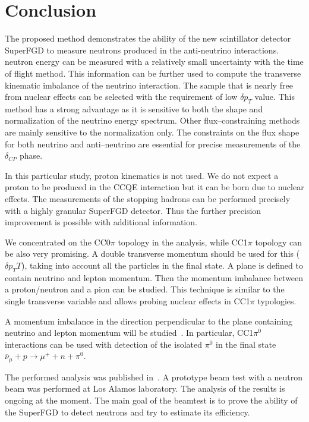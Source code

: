 \documentclass[main.tex]{subfiles}
\begin{document}
\section{Conclusion}
The proposed method demonstrates the ability of the new scintillator detector SuperFGD to measure neutrons produced in the anti-neutrino interactions. neutron energy can be measured with a relatively small uncertainty with the time of flight method. This information can be further used to compute the transverse kinematic imbalance of the neutrino interaction. The sample that is nearly free from nuclear effects can be selected with the requirement of low $\delta p_T$ value. This method has a strong advantage as it is sensitive to both the shape and normalization of the neutrino energy spectrum. Other flux--constraining methods are mainly sensitive to the normalization only. The constraints on the flux shape for both neutrino and anti--neutrino are essential for precise measurements of the $\delta_{CP}$ phase.

In this particular study, proton kinematics is not used. We do not expect a proton to be produced in the CCQE interaction but it can be born due to nuclear effects. The measurements of the stopping hadrons can be performed precisely with a highly granular SuperFGD detector. Thus the further precision improvement is possible with additional information.

We concentrated on the CC0$\pi$ topology in the analysis, while CC1$\pi$ topology can be also very promising. A double transverse momentum should be used for this ($\delta p_TT$), taking into account all the particles in the final state. A plane is defined to contain neutrino and lepton momentum. Then the momentum imbalance between a proton/neutron and a pion can be studied. This technique is similar to the single transverse variable and allows probing nuclear effects in CC1$\pi$ typologies.

A momentum imbalance in the direction perpendicular to the plane containing neutrino and lepton momentum will be studied~\cite{Lu2015}. 
In particular, CC1$\pi^0$ interactions can be used with detection of the isolated $\pi^0$ in the final state $\overline{\nu}_\mu+p\to\mu^++n+\pi^0$. 

The performed analysis was published in~\cite{Munteanu2019}. A prototype beam test with a neutron beam was performed at Los Alamos laboratory. The analysis of the results is ongoing at the moment. The main goal of the beamtest is to prove the ability of the SuperFGD to detect neutrons and try to estimate its efficiency. 
\end{document}
